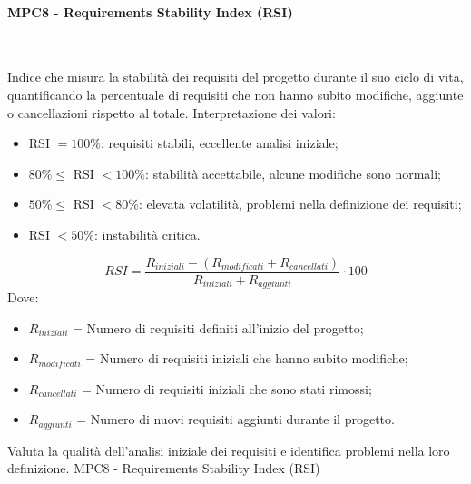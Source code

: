 \documentclass[10pt, letterpaper]{article}
\newcommand{\trisubsection}[1]{\paragraph{#1}\mbox{}\\}
\begin{document}
\trisubsection{MPC8 - Requirements Stability Index (RSI)}
\label{sec:MPC8}
{Indice che misura la stabilità dei requisiti del progetto durante il suo ciclo
    di vita, quantificando la percentuale di requisiti che non hanno subito modifiche,
    aggiunte o cancellazioni rispetto al totale.
    Interpretazione dei valori:
    \begin{itemize}
        \item RSI $= 100\%$: requisiti stabili, eccellente analisi iniziale;
        \item $80\% \leq $ RSI $ < 100\%$: stabilità accettabile, alcune modifiche sono normali;
        \item $50\% \leq $ RSI $ < 80\%$: elevata volatilità, problemi nella definizione dei requisiti;
        \item RSI $< 50\%$: instabilità critica.
    \end{itemize}}
{\[RSI = \frac{R_{iniziali} - (R_{modificati} + R_{cancellati})}{R_{iniziali} + R_{aggiunti}} \cdot 100\]
    Dove:
    \begin{itemize}
        \item $R_{iniziali}$ = Numero di requisiti definiti all'inizio del progetto;
        \item $R_{modificati}$ = Numero di requisiti iniziali che hanno subito modifiche;
        \item $R_{cancellati}$ = Numero di requisiti iniziali che sono stati rimossi;
        \item $R_{aggiunti}$ = Numero di nuovi requisiti aggiunti durante il progetto.
    \end{itemize}
}
{Valuta la qualità dell'analisi iniziale dei requisiti e identifica problemi
    nella loro definizione.}
{MPC8 - Requirements Stability Index (RSI)}

\end{document}
